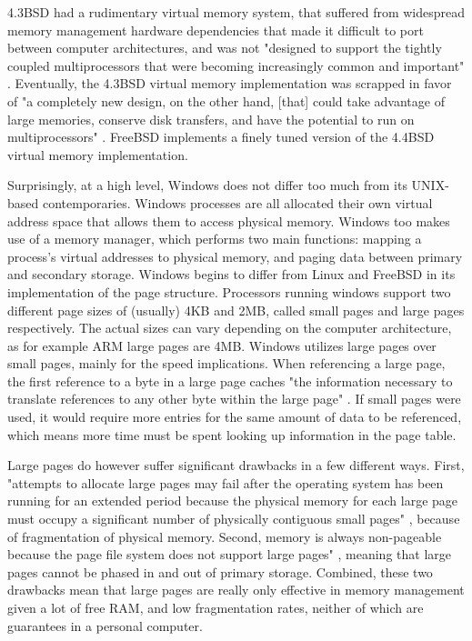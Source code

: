 \documentclass[10pt,draftclsnofoot,onecolumn]{IEEEtran}
\begin{document}
    4.3BSD had a rudimentary virtual memory system, that suffered from widespread memory management hardware dependencies that made it difficult to port between computer architectures, and was not "designed to support the tightly coupled multiprocessors that were becoming increasingly common and important" \cite{mckusick_neville-neil_watson_mckusick_2015}. Eventually, the 4.3BSD virtual memory implementation was scrapped in favor of "a completely new design, on the other hand, [that] could take advantage of large memories, conserve disk transfers, and have the potential to run on multiprocessors" \cite{mckusick_neville-neil_watson_mckusick_2015}. FreeBSD implements a finely tuned version of the 4.4BSD virtual memory implementation.\par
    Surprisingly, at a high level, Windows does not differ too much from its UNIX-based contemporaries. Windows processes are all allocated their own virtual address space that allows them to access physical memory. Windows too makes use of a memory manager, which performs two main functions: mapping a process's virtual addresses to physical memory, and paging data between primary and secondary storage.
    Windows begins to differ from Linux and FreeBSD in its implementation of the page structure. Processors running windows support two different page sizes of (usually) 4KB and 2MB, called small pages and large pages respectively. The actual sizes can vary depending on the computer architecture, as for example ARM large pages are 4MB. Windows utilizes large pages over small pages, mainly for the speed implications. When referencing a large page, the first reference to a byte in a large page caches "the information necessary to translate references to any other byte within the large page" \cite{russinovich_solomon_ionescu_2012}. If small pages were used, it would require more entries for the same amount of data to be referenced, which means more time must be spent looking up information in the page table.\par
    Large pages do however suffer significant drawbacks in a few different ways. First, "attempts to allocate large pages may fail after the operating system has been running for an extended period because the physical memory for each large page must occupy a significant number of physically contiguous small pages" \cite{russinovich_solomon_ionescu_2012}, because of fragmentation of physical memory. Second, memory is always non-pageable because the page file system does not support large pages" \cite{russinovich_solomon_ionescu_2012}, meaning that large pages cannot be phased in and out of primary storage. Combined, these two drawbacks mean that large pages are really only effective in memory management given a lot of free RAM, and low fragmentation rates, neither of which are guarantees in a personal computer.\par
\end{document}
